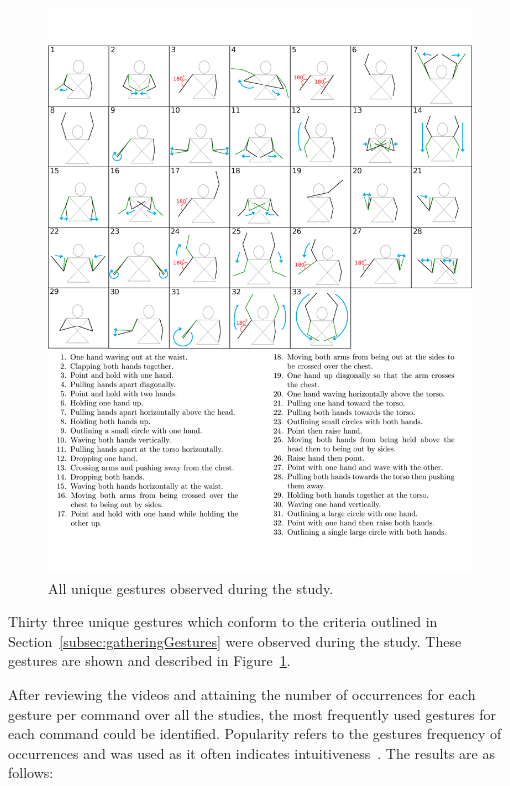 \documentclass[link]{IWCOMP}
\begin{document}
\begin{figure}[p]
   \centering
   \includegraphics[width=1\textwidth]{figures/all_gestures.png}
   \caption{All unique gestures observed during the study.}
   \label{fig:allGestures}
\end{figure}

Thirty three unique gestures which conform to the criteria outlined in Section~\ref{subsec:gatheringGestures} were observed during the study.
These gestures are shown and described in Figure~\ref{fig:allGestures}.  

After reviewing the videos and attaining the number of occurrences for each gesture per command over all the studies, the most frequently used gestures for each command could be identified.
Popularity refers to the gestures frequency of occurrences and was used as it often indicates intuitiveness~\cite{Grandhi2011}.
The results are as follows: \\
\end{document}
